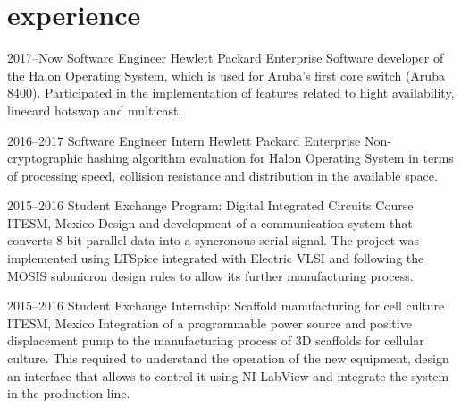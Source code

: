 \documentclass[]{friggeri-cv} %
\begin{document}

\section{experience}


\begin{entrylist}


\entry
{2017--Now}
{Software Engineer}
{Hewlett Packard Enterprise}
{Software developer of the Halon Operating System, which is used for Aruba's first core
switch (Aruba 8400). Participated in the implementation of features related to hight availability, 
linecard hotswap and multicast.} 

\entry
{2016--2017}
{Software Engineer Intern}
{Hewlett Packard Enterprise}
{Non-cryptographic hashing algorithm evaluation for Halon Operating
System in terms of processing speed, collision resistance and distribution in the 
available space.} 

\entry
{2015--2016}
{Student Exchange Program: Digital Integrated Circuits Course}
{ITESM, Mexico}
{Design and development of a communication system that converts 8 bit parallel
data into a syncronous serial signal. The project was implemented using
LTSpice integrated with Electric VLSI and following the MOSIS submicron design
rules to allow its further manufacturing process.} 

\entry
{2015--2016}
{Student Exchange Internship: Scaffold manufacturing for cell culture}
{ITESM, Mexico}
{Integration of a programmable power source and positive displacement pump
to the manufacturing process of 3D scaffolds for cellular culture. This required to
understand the operation of the new equipment, design an interface that allows
to control it using NI LabView and integrate the system in the production line.} 


\end{entrylist}
\end{document}
